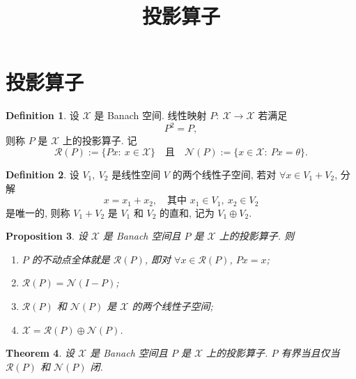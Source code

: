 \documentclass[a4paper,11pt]{article}
\title{投影算子}
\newtheorem{theorem}{Theorem}[section]
\newtheorem{proposition}[theorem]{Proposition}
\theoremstyle{definition}
\newtheorem{definition}[theorem]{Definition}
\begin{document}
\maketitle

\section{投影算子}

\begin{definition}
    设 $ \mathcal{X} $ 是 Banach 空间. 线性映射 $ P :\ \mathcal{X} \to \mathcal{X} $ 若满足
    $$
        P^2 = P,
    $$
    则称 $ P $ 是 $ \mathcal{X} $ 上的投影算子. 记 
    $$
        \mathcal{R}(P) := \{ P x :\ x \in \mathcal{X}\} 
        \quad \text{且} \quad
        \mathcal{N}(P) := \{x \in \mathcal{X} :\ Px = \theta \}.
    $$
\end{definition}

\begin{definition}
    设 $ V_1,\ V_2 $ 是线性空间 $ V $ 的两个线性子空间, 若对 $ \forall x \in V_1 + V_2 $,
    分解 
    $$  
        x = x_1 + x_2, \quad \text{其中 } x_1 \in V_1,\ x_2 \in V_2
    $$
    是唯一的, 则称 $ V_1 + V_2 $ 是 $ V_1 $ 和 $ V_2 $ 的直和, 记为 $ V_1 \oplus V_2 $.
\end{definition}

\begin{proposition}
    设 $ \mathcal{X} $ 是 Banach 空间且 $ P $ 是 $ \mathcal{X} $ 上的投影算子. 则
    \begin{enumerate}[{\rm(i)}]
        \item $ P $ 的不动点全体就是 $ \mathcal{R}(P) $, 即对 $ \forall x \in \mathcal{R}(P) $, $ Px = x $;
        \item $ \mathcal{R}(P) = \mathcal{N}(I - P) $;
        \item $ \mathcal{R}(P) $ 和 $ \mathcal{N}(P) $ 是 $ \mathcal{X} $ 的两个线性子空间;
        \item $ \mathcal{X} = \mathcal{R}(P) \oplus \mathcal{N}(P) $.
    \end{enumerate}
\end{proposition}


\begin{theorem} \label{3}
    设 $ \mathcal{X} $ 是 Banach 空间且 $ P $ 是 $ \mathcal{X} $ 上的投影算子. 
    $ P $ 有界当且仅当 $ \mathcal{R}(P) $ 和 $ \mathcal{N}(P) $ 闭.
\end{theorem}
\end{document}

